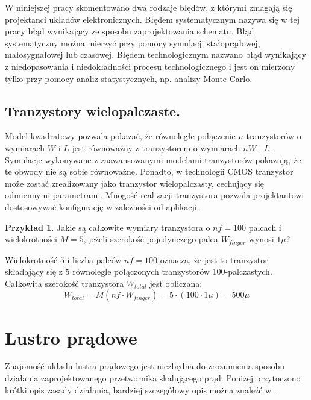 \documentclass[10pt,a4paper,twoside]{report}
\theoremstyle{definition}
\theoremstyle{definition}
\theoremstyle{definition}
\newtheorem{przyklad}{Przykład}[section]
\theoremstyle{definition}
\theoremstyle{definition}
\begin{document}
{	{	W niniejszej pracy skomentowano dwa rodzaje błędów, z którymi zmagają się projektanci układów elektronicznych. Błędem systematycznym nazywa się w tej pracy błąd wynikający ze sposobu zaprojektowania schematu. Błąd systematyczny można mierzyć przy pomocy symulacji stałoprądowej, małosygnałowej lub czasowej. Błędem technologicznym nazwano błąd wynikający z niedopasowania i niedokładności procesu technologicznego i jest on mierzony tylko przy pomocy analiz statystycznych, np. analizy Monte Carlo. }

	\subsection{Tranzystory wielopalczaste.}
	{	Model kwadratowy pozwala pokazać, że równoległe połączenie $n$ tranzystorów o wymiarach $W$ i $L$ jest równoważny z tranzystorem o wymiarach $nW$ i $L$. Symulacje wykonywane z zaawansowanymi modelami tranzystorów pokazują, że te obwody nie są sobie równoważne. Ponadto, w technologii CMOS tranzystor może zostać zrealizowany jako tranzystor wielopalczasty, cechujący się odmiennymi parametrami. Mnogość realizacji tranzystora pozwala projektantowi dostosowywać konfigurację w zależności od aplikacji. }
	\begin{przyklad}{Jakie są całkowite wymiary tranzystora o $nf=100$ palcach i wielokrotności $M=5$, jeżeli szerokość pojedynczego palca $W_{finger}$ wynosi $1\mu$?}

	{	Wielokrotność $5$ i liczba palców $nf=100$ oznacza, że jest to tranzystor składający się z 5 równolegle połączonych tranzystorów 100-palczastych. Całkowita szerokość tranzystora $W_{total}$ jest obliczana:
	\begin{equation}
		W_{total} = M \left(nf \cdot W_{finger}  \right) = 5 \cdot \left(100 \cdot 1\mu \right) = 500 \mu 
	\end{equation}}
	\end{przyklad}
	

	\section{Lustro prądowe}
	{	Znajomość układu lustra prądowego jest niezbędna do zrozumienia sposobu działania zaprojektowanego przetwornika skalującego prąd. Poniżej przytoczono krótki opis zasady działania, bardziej szczegółowy opis można znaleźć w \cite{cmosanal}.}
}
\end{document}
